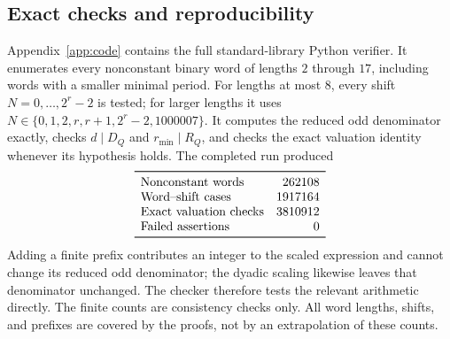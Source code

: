 \documentclass[11pt]{article}
\theoremstyle{definition}
\theoremstyle{remark}
\begin{document}
\subsection{Exact checks and reproducibility}
Appendix~\ref{app:code} contains the full standard-library Python
verifier. It enumerates every nonconstant binary word of lengths
$2$ through $17$, including words with a smaller minimal period.
For lengths at most $8$, every shift $N=0,\ldots,2^r-2$ is tested;
for larger lengths it uses
$N\in\{0,1,2,r,r+1,2^r-2,1000007\}$.
It computes the reduced odd denominator exactly, checks $d\mid D_Q$
and $r_{\min}\mid R_Q$, and checks the exact valuation identity
whenever its hypothesis holds. The completed run produced
\[
\begin{array}{lr}
\toprule
\text{Nonconstant words}&262108\\
\text{Word--shift cases}&1917164\\
\text{Exact valuation checks}&3810912\\
\text{Failed assertions}&0\\
\bottomrule
\end{array}
\]
Adding a finite prefix contributes an integer to the scaled expression
and cannot change its reduced odd denominator; the dyadic scaling
likewise leaves that denominator unchanged. The checker therefore
tests the relevant arithmetic directly. The finite counts are
consistency checks only. All word lengths, shifts, and prefixes are
covered by the proofs, not by an extrapolation of these counts.

\appendix
\end{document}

